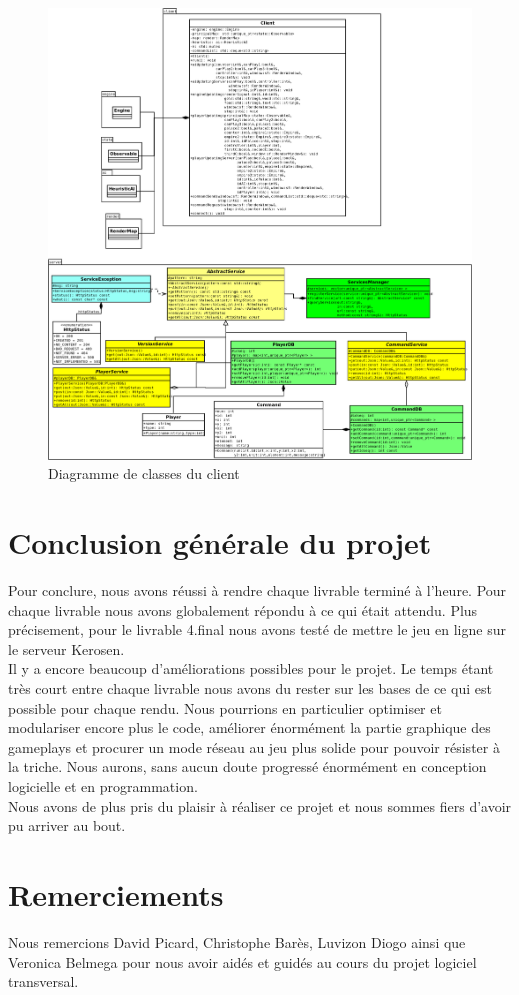 \documentclass[12pt,a4paper]{article}
\begin{document}
\newpage
\begin{figure}[!ht]
\centering
    \includegraphics[width=1\textwidth]{ressources/module.png}
     \caption{Diagramme de classes du client}
\end{figure}
\newpage
\section{Conclusion générale du projet}
Pour conclure, nous avons réussi à rendre chaque livrable terminé à l'heure. Pour chaque livrable nous avons globalement répondu à ce qui était attendu. Plus précisement, pour le livrable 4.final nous avons testé de mettre le jeu en ligne sur le serveur Kerosen.\\ 
Il y a encore beaucoup d'améliorations possibles pour le projet. Le temps étant très court entre chaque livrable nous avons du rester sur les bases de ce qui est possible pour chaque rendu. Nous pourrions en particulier optimiser et modulariser encore plus le code, améliorer énormément la partie graphique des gameplays et procurer un mode réseau au jeu plus solide pour pouvoir résister à la triche.
Nous aurons, sans aucun doute progressé énormément en conception logicielle et en programmation.\\
Nous avons de plus pris du plaisir à réaliser ce projet et nous sommes fiers d'avoir pu arriver au bout.
\newpage

\section{Remerciements}
Nous remercions David Picard, Christophe Barès, Luvizon Diogo ainsi que Veronica Belmega pour nous avoir aidés et guidés au cours du projet logiciel transversal.
\end{document}
